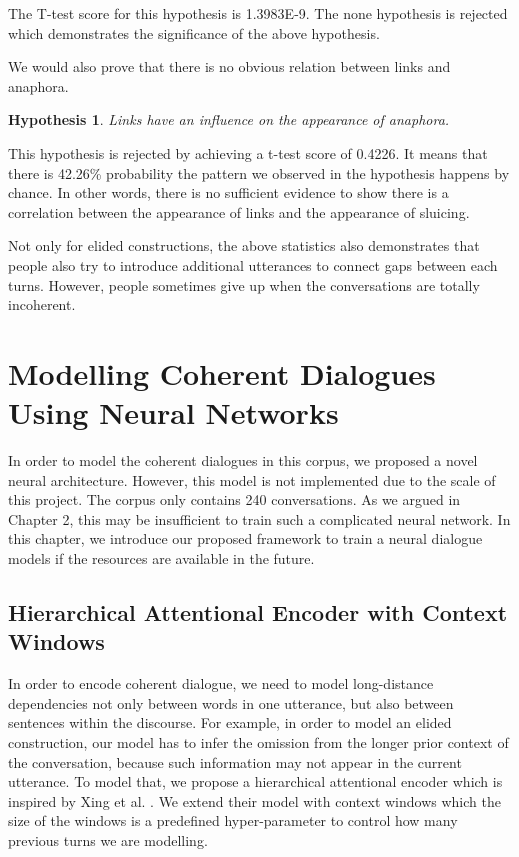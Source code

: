 \documentclass[bsc,frontabs,twoside,singlespacing,parskip,deptreport]{infthesis}     %
\newtheorem{hypo}{Hypothesis}[chapter]
\begin{document}
The T-test score for this hypothesis is 1.3983E-9. The none hypothesis is rejected which demonstrates the significance of the above hypothesis.

We would also prove that there is no obvious relation between links and anaphora.

\begin{hypo}
Links have an influence on the appearance of anaphora.
\end{hypo}

This hypothesis is rejected by achieving a t-test score of 0.4226. It means that there is 42.26\% probability the pattern we observed in the hypothesis happens by chance. In other words, there is no sufficient evidence to show there is a correlation between the appearance of links and the appearance of sluicing.

Not only for elided constructions, the above statistics also demonstrates that people also try to introduce additional utterances to connect gaps between each turns. However, people sometimes give up when the conversations are totally incoherent.


\chapter{Modelling Coherent Dialogues Using Neural Networks}

In order to model the coherent dialogues in this corpus, we proposed a novel neural architecture. However, this model is not implemented due to the scale of this project. The corpus only contains 240 conversations. As we argued in Chapter 2, this may be insufficient to train such a complicated neural network. In this chapter, we introduce our proposed framework to train a neural dialogue models if the resources are available in the future.

\section{Hierarchical Attentional Encoder with Context Windows}

In order to encode coherent dialogue, we need to model long-distance dependencies not only between words in one utterance, but also between sentences within the discourse. For example, in order to model an elided construction, our model has to infer the omission from the longer prior context of the conversation, because such information may not appear in the current utterance. To model that, we propose a hierarchical attentional encoder which is inspired by Xing et al. \cite{xing2018hierarchical}. We extend their model with context windows which the size of the windows is a predefined hyper-parameter to control how many previous turns we are modelling. 
\end{document}
